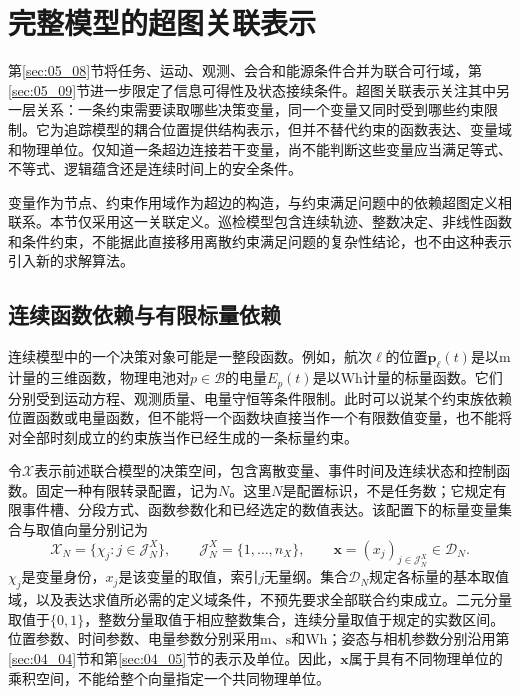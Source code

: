 \section{完整模型的超图关联表示}
\label{sec:05_10}

第\ref{sec:05_08}节将任务、运动、观测、会合和能源条件合并为联合可行域，第\ref{sec:05_09}节进一步限定了信息可得性及状态接续条件。超图关联表示关注其中另一层关系：一条约束需要读取哪些决策变量，同一个变量又同时受到哪些约束限制。它为追踪模型的耦合位置提供结构表示，但并不替代约束的函数表达、变量域和物理单位。仅知道一条超边连接若干变量，尚不能判断这些变量应当满足等式、不等式、逻辑蕴含还是连续时间上的安全条件。

变量作为节点、约束作用域作为超边的构造，与约束满足问题中的依赖超图定义相联系\cite{Marx2011}。本节仅采用这一关联定义。巡检模型包含连续轨迹、整数决定、非线性函数和条件约束，不能据此直接移用离散约束满足问题的复杂性结论，也不由这种表示引入新的求解算法。

\subsection{连续函数依赖与有限标量依赖}

连续模型中的一个决策对象可能是一整段函数。例如，航次$\ell$的位置$\mathbf p_\ell(t)$是以$\mathrm m$计量的三维函数，物理电池对$p\in\mathcal B$的电量$E_p(t)$是以$\mathrm{Wh}$计量的标量函数。它们分别受到运动方程、观测质量、电量守恒等条件限制。此时可以说某个约束族依赖位置函数或电量函数，但不能将一个函数块直接当作一个有限数值变量，也不能将对全部时刻成立的约束族当作已经生成的一条标量约束。

令$\mathscr X$表示前述联合模型的决策空间，包含离散变量、事件时间及连续状态和控制函数。固定一种有限转录配置，记为$N$。这里$N$是配置标识，不是任务数；它规定有限事件槽、分段方式、函数参数化和已经选定的数值表达。该配置下的标量变量集合与取值向量分别记为
\begin{equation}
 \mathcal X_N=\{\chi_j:j\in\mathcal J_N^X\},
 \qquad
 \mathcal J_N^X=\{1,\ldots,n_X\},
 \qquad
 \mathbf x=(x_j)_{j\in\mathcal J_N^X}\in\mathcal D_N.
 \label{s0510:scalar_variables}
\end{equation}
$\chi_j$是变量身份，$x_j$是该变量的取值，索引$j$无量纲。集合$\mathcal D_N$规定各标量的基本取值域，以及表达求值所必需的定义域条件，不预先要求全部联合约束成立。二元分量取值于$\{0,1\}$，整数分量取值于相应整数集合，连续分量取值于规定的实数区间。位置参数、时间参数、电量参数分别采用$\mathrm m$、$\mathrm s$和$\mathrm{Wh}$；姿态与相机参数分别沿用第\ref{sec:04_04}节和第\ref{sec:04_05}节的表示及单位。因此，$\mathbf x$属于具有不同物理单位的乘积空间，不能给整个向量指定一个共同物理单位。


